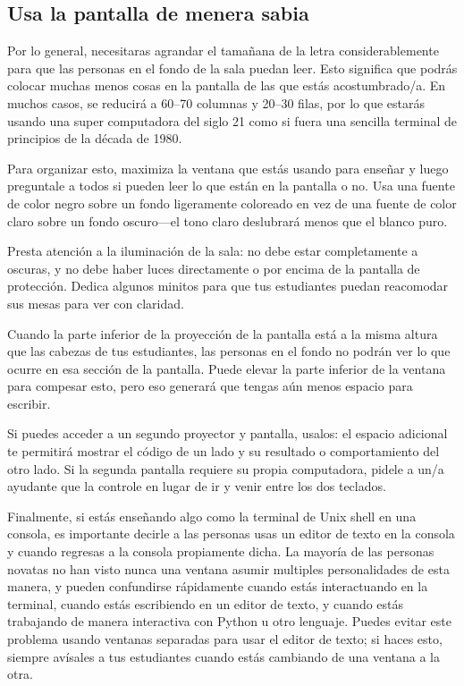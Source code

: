 \subsection*{Usa la pantalla de menera sabia}

Por lo general, necesitaras agrandar el tamañana de la letra considerablemente
para que las personas en el fondo de la sala puedan leer. 
Esto significa que podrás colocar muchas menos cosas en la pantalla de las que estás acostumbrado/a.
En muchos casos, se reducirá a 60--70 columnas y 20--30 filas,
por lo que estarás usando una super computadora del siglo 21
como si fuera una sencilla terminal de principios de la década de 1980.

Para organizar esto,
maximiza la ventana que estás usando para enseñar
y luego preguntale a todos si pueden leer lo que están en la pantalla o no.
Usa una fuente de color negro sobre un fondo ligeramente coloreado en vez de una fuente de color claro sobre un fondo oscuro---el tono claro deslubrará 
menos que el blanco puro.

Presta atención a la iluminación de la sala:
no debe estar completamente a oscuras, y no debe haber luces directamente 
o por encima de la pantalla de protección.
Dedica algunos minitos para que tus estudiantes puedan reacomodar sus mesas
para ver con claridad.

Cuando la parte inferior de la proyección de la pantalla está a la misma altura que las cabezas de tus estudiantes,
las personas en el fondo no podrán ver lo que ocurre en esa sección de la pantalla.
Puede elevar la parte inferior de la ventana para compesar esto,
pero eso generará que tengas aún menos espacio para escribir.

Si puedes acceder a un segundo proyector y pantalla,
usalos:
el espacio adicional te permitirá mostrar el código de un lado
y su resultado o comportamiento del otro lado.
Si la segunda pantalla requiere su propia computadora,
pidele a un/a ayudante que la controle
en lugar de ir y venir entre los dos teclados.

Finalmente,
si estás enseñando algo como la terminal de Unix shell en una consola,
es importante decirle a las personas usas un editor de texto en la consola
y cuando regresas a la consola propiamente dicha.
La mayoría de las personas novatas no han visto nunca una ventana asumir multiples personalidades de esta manera,
y pueden confundirse rápidamente
cuando estás interactuando en la terminal,
cuando estás escribiendo en un editor de texto,
y cuando estás trabajando de manera interactiva con Python u otro lenguaje.
Puedes evitar este problema usando ventanas separadas para usar el editor de texto;
si haces esto,
siempre avísales a tus estudiantes cuando estás cambiando de una ventana a la otra.

